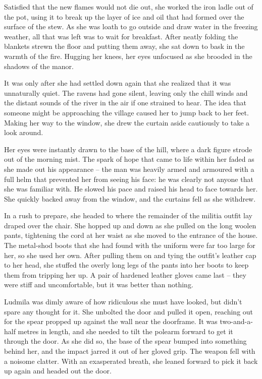  

Satisfied that the new flames would not die out, she worked the iron ladle out of the pot, using it to break up the layer of ice and oil that had formed over the surface of the stew. As she was loath to go outside and draw water in the freezing weather, all that was left was to wait for breakfast. After neatly folding the blankets strewn the floor and putting them away, she sat down to bask in the warmth of the fire. Hugging her knees, her eyes unfocused as she brooded in the shadows of the manor.

 

It was only after she had settled down again that she realized that it was unnaturally quiet. The ravens had gone silent, leaving only the chill winds and the distant sounds of the river in the air if one strained to hear. The idea that someone might be approaching the village caused her to jump back to her feet. Making her way to the window, she drew the curtain aside cautiously to take a look around.

 

Her eyes were instantly drawn to the base of the hill, where a dark figure strode out of the morning mist. The spark of hope that came to life within her faded as she made out his appearance – the man was heavily armed and armoured with a full helm that prevented her from seeing his face: he was clearly not anyone that she was familiar with. He slowed his pace and raised his head to face towards her. She quickly backed away from the window, and the curtains fell as she withdrew.

 

In a rush to prepare, she headed to where the remainder of the militia outfit lay draped over the chair. She hopped up and down as she pulled on the long woolen pants, tightening the cord at her waist as she moved to the entrance of the house. The metal-shod boots that she had found with the uniform were far too large for her, so she used her own. After pulling them on and tying the outfit’s leather cap to her head, she stuffed the overly long legs of the pants into her boots to keep them from tripping her up. A pair of hardened leather gloves came last – they were stiff and uncomfortable, but it was better than nothing.

 

Ludmila was dimly aware of how ridiculous she must have looked, but didn’t spare any thought for it. She unbolted the door and pulled it open, reaching out for the spear propped up against the wall near the doorframe. It was two-and-a-half metres in length, and she needed to tilt the polearm forward to get it through the door. As she did so, the base of the spear bumped into something behind her, and the impact jarred it out of her gloved grip. The weapon fell with a noisome clatter. With an exasperated breath, she leaned forward to pick it back up again and headed out the door.

